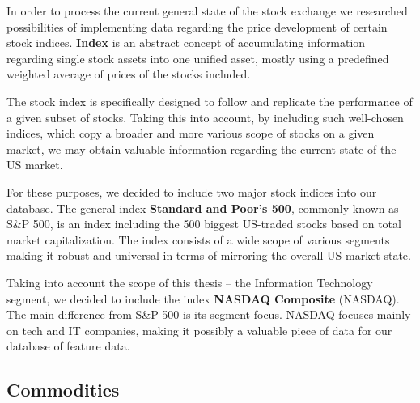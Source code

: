 In order to process the current general state of the stock exchange we researched possibilities of
implementing data regarding the price development of certain stock indices. \textbf{Index} is an abstract 
concept of accumulating information regarding single stock assets into one unified asset, mostly using a predefined
weighted average of prices of the stocks included.
\par
The stock index is specifically designed to follow and replicate the performance of a given subset of stocks. Taking this into account,
by including such well-chosen indices, which copy a broader and more various scope of stocks on a given market, we may obtain valuable
information regarding the current state of the US market.
\par
For these purposes, we decided to include two major stock indices into our database. The general index \textbf{Standard and Poor's 500}, commonly
known as S\&P 500, is an index including the 500 biggest US-traded stocks based on total market capitalization. The index consists of a wide scope of various
segments making it robust and universal in terms of mirroring the overall US market state.
\par
Taking into account the scope of this thesis – the Information Technology segment, we decided to include the index \textbf{NASDAQ Composite} (NASDAQ). The main
difference from S\&P 500 is its segment focus. NASDAQ focuses mainly on tech and IT companies, making it possibly a valuable piece of data for our database of feature data.  

\subsection{Commodities}

